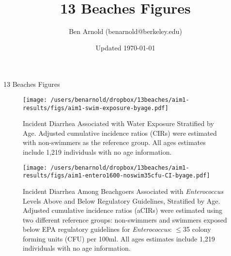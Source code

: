 \documentclass[11pt]{article}
\title{13 Beaches Figures}
\author{Ben Arnold (benarnold@berkeley.edu)}
\date{Updated \today}
\begin{document}
{\centerline {\LARGE 13 Beaches Figures} }


\begin{landscape}
\begin{figure}[htbp]
\begin{center}
\texttt{[image: /users/benarnold/dropbox/13beaches/aim1-results/figs/aim1-swim-exposure-byage.pdf]}
\begin{minipage}{1.2\textwidth}
\caption{Incident Diarrhea Associated with Water Exposure Stratified by Age. Adjusted cumulative incidence ratios (CIRs) were estimated with non-swimmers as the reference group. All ages estimates include 1,219 individuals with no age information.}
\label{fig:swimex}
\end{minipage}
\end{center}
\end{figure}
\end{landscape}

\begin{landscape}
\begin{figure}[htbp]
\begin{center}
\texttt{[image: /users/benarnold/dropbox/13beaches/aim1-results/figs/aim1-entero1600-noswim35cfu-CI-byage.pdf]} \\
\begin{minipage}{1.2\textwidth}
\caption{Incident Diarrhea Among Beachgoers Associated with \textit{Enterococcus} Levels Above and Below Regulatory Guidelines, Stratified by Age. Adjusted cumulative incidence ratios (aCIRs) were estimated using two different reference groups: non-swimmers and swimmers exposed below EPA regulatory guidelines for \textit{Enterococcus}: $\leq$35 colony forming units (CFU) per 100ml. All ages estimates include 1,219 individuals with no age information.}
\label{fig:enteroregulatory}
\end{minipage}
\end{center}
\end{figure}
\end{landscape}
\end{document}
